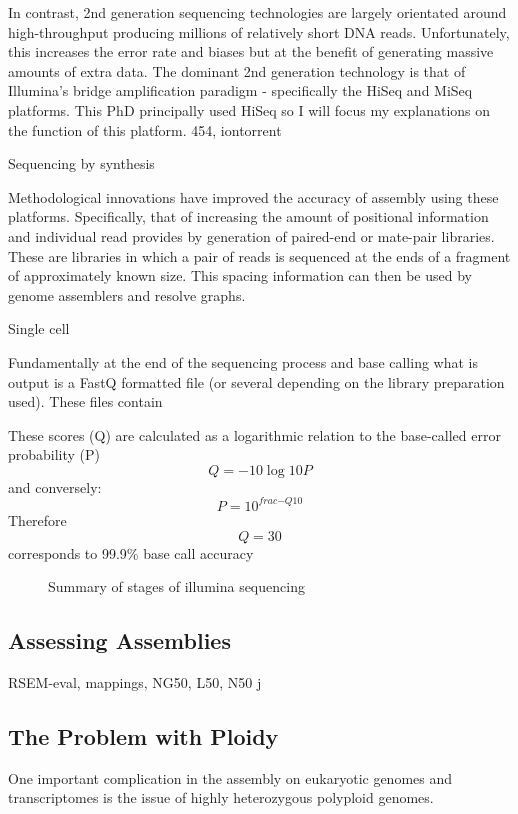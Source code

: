 In contrast, 2nd generation sequencing technologies are largely orientated
around high-throughput producing millions of relatively short DNA reads.  
Unfortunately, this increases the error rate and biases but at the benefit of 
generating massive amounts of extra data.
The dominant 2nd generation technology is that of Illumina's bridge amplification
paradigm - specifically the HiSeq and MiSeq platforms.  This PhD principally
used HiSeq so I will focus my explanations on the function of this platform.
454, iontorrent


Sequencing by synthesis




Methodological innovations have improved the accuracy of assembly using these platforms.
Specifically, that of increasing the amount of positional information and individual read
provides by generation of paired-end or mate-pair libraries.  These are libraries in which
a pair of reads is sequenced at the ends of a fragment of approximately known size.
This spacing information can then be used by genome assemblers and resolve graphs.


Single cell



Fundamentally at the end of the sequencing process and base calling what is output is 
a FastQ formatted file (or several depending on the library preparation used).
These files contain 

These scores (Q) are calculated as a logarithmic relation to the base-called error probability (P)
\[ Q = -10\log{10}{P} \]
and conversely: 
\[ P = 10^{frac{-Q}{10}} \]
Therefore \[Q = 30 \] corresponds to 99.9\% base call accuracy


\begin{figure}
    Summary of stages of illumina sequencing
\end{figure}




\subsection{Assessing Assemblies}

RSEM-eval, mappings, NG50, L50, N50
j
\subsection{The Problem with Ploidy}

One important complication in the assembly on eukaryotic genomes and transcriptomes
is the issue of highly heterozygous polyploid genomes.

